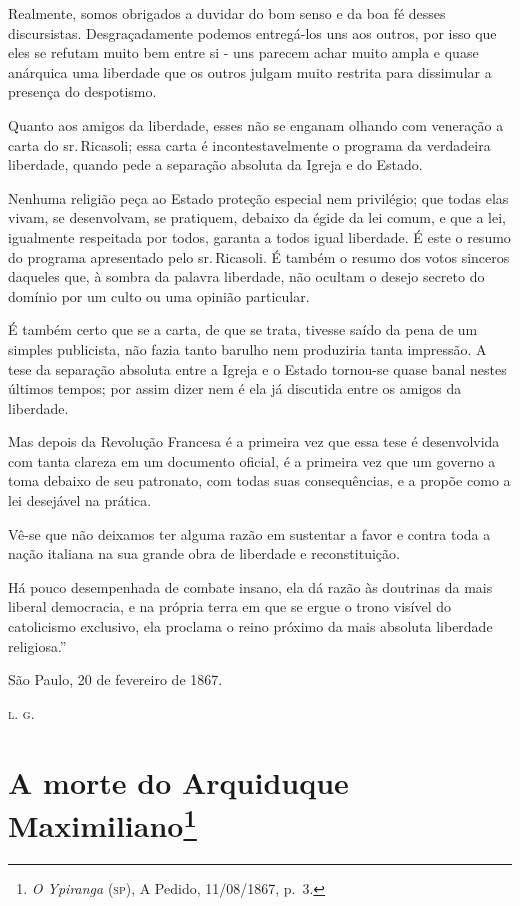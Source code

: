 Realmente, somos obrigados a duvidar do bom senso e da boa fé desses
discursistas. Desgraçadamente podemos entregá-los uns aos outros, por
isso que eles se refutam muito bem entre si - uns parecem achar muito
ampla e quase anárquica uma liberdade que os outros julgam muito
restrita para dissimular a presença do despotismo.

Quanto aos amigos da liberdade, esses não se enganam olhando com
veneração a carta do sr.\,Ricasoli; essa carta é incontestavelmente o
programa da verdadeira liberdade, quando pede a separação absoluta da
Igreja e do Estado.

Nenhuma religião peça ao Estado proteção especial nem privilégio; que
todas elas vivam, se desenvolvam, se pratiquem, debaixo da égide da lei
comum, e que a lei, igualmente respeitada por todos, garanta a todos
igual liberdade. É este o resumo do programa apresentado pelo sr.\,Ricasoli. É também o resumo dos votos sinceros daqueles que, à sombra da
palavra liberdade, não ocultam o desejo secreto do domínio por um culto
ou uma opinião particular.

É também certo que se a carta, de que se trata, tivesse saído da pena de
um simples publicista, não fazia tanto barulho nem produziria tanta
impressão. A tese da separação absoluta entre a Igreja e o Estado
tornou-se quase banal nestes últimos tempos; por assim dizer nem é ela
já discutida entre os amigos da liberdade.

Mas depois da Revolução Francesa é a primeira vez que essa tese é
desenvolvida com tanta clareza em um documento oficial, é a primeira vez
que um governo a toma debaixo de seu patronato, com todas suas
consequências, e a propõe como a lei desejável na prática.

Vê-se que não deixamos ter alguma razão em sustentar a favor e contra
toda a nação italiana na sua grande obra de liberdade e reconstituição.

Há pouco desempenhada de combate insano, ela dá razão às doutrinas da
mais liberal democracia, e na própria terra em que se ergue o trono
visível do catolicismo exclusivo, ela proclama o reino próximo da mais
absoluta liberdade religiosa.''
\begin{flushright}
São Paulo, 20 de fevereiro de 1867.

\textsc{l. g.}
\end{flushright}
\chapter{A morte do Arquiduque Maximiliano\footnote{\emph{O Ypiranga} (\textsc{sp}), A Pedido,
  11/08/1867, p.~3.}}

